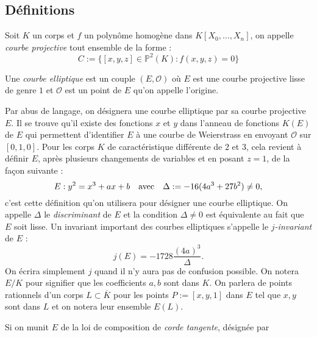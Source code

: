 \documentclass[a4paper]{article} %
\numberwithin{section}{part}
\numberwithin{equation}{section}
\newcommand\EO{\mathcal{O}}
\newcommand\PP[1]{\mathbb{P}^{#1}}
\begin{document}
\subsection{Définitions}
Soit $K$ un corps et $f$ un polynôme homogène dans $K[X_0,\dots,X_n]$, on
appelle \emph{courbe projective} tout ensemble de la forme :
\begin{equation}
C := \lbrace{[x,y,z]\in \PP{2}(K) : f(x,y,z) = 0}\rbrace
\end{equation}
\begin{defn}
Une \emph{courbe elliptique} est un couple $(E,\EO)$ où $E$ est une courbe 
projective lisse de genre $1$ et $\EO$ est un point de $E$ qu'on appelle 
l'origine.
\end{defn}
Par abus de langage, on désignera une courbe elliptique par sa courbe projective
$E$. Il se trouve qu'il existe des fonctions $x$ et $y$ dans l'anneau de 
fonctions $K(E)$ de $E$ qui permettent d'identifier $E$ à une courbe de 
Weierstrass en envoyant $\EO$ sur $[0,1,0]$. Pour les corps $K$ de 
caractéristique différente de $2$ et $3$, cela revient à définir $E$, après 
plusieurs changements de variables et en posant $z = 1$, de la façon suivante :
\begin{equation}
\label{eq:weiersimpl}
E : y^2 = x^3 + ax + b\quad\textup{avec}\quad \Delta := -16(4a^3 + 27b^2)\neq 0,
\end{equation}
c'est cette définition qu'on utilisera pour désigner une courbe elliptique. On
appelle $\Delta$ le \emph{discriminant} de $E$ et la condition $\Delta\neq0$ est
équivalente au fait que $E$ soit lisse. Un invariant important des courbes 
elliptiques s'appelle le \emph{$j$-invariant} de $E$ :
\begin{equation}
j(E) = -1728\dfrac{(4a)^3}{\Delta}.
\end{equation}
On écrira simplement $j$ quand il n'y aura pas de confusion possible.
On notera $E/K$ pour signifier que les coefficients $a, b$ sont dans $K$. On
parlera de points rationnels d'un corps $L\subset\overline{K}$ pour les points
$P := [x,y,1]$ dans $E$ tel que $x, y$ sont dans $L$ et on notera leur ensemble
$E(L)$.\par
\vspace{0.3cm}
Si on munit $E$ de la loi de composition de \emph{corde tangente}, désignée par
\end{document}
